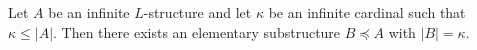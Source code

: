 Let $A$ be an infinite $L$-structure and let $\kappa$ be an infinite cardinal such that $\kappa \leq |A|$. Then there exists an elementary substructure $B \preceq A$ with $|B| = \kappa$.
